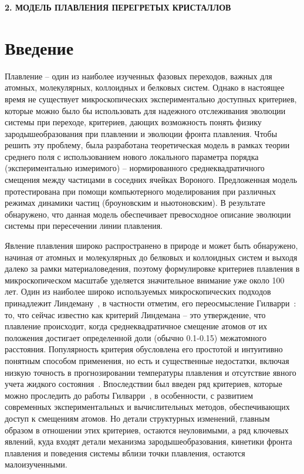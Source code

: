
\begin{center}
\textbf{\large 2. МОДЕЛЬ ПЛАВЛЕНИЯ ПЕРЕГРЕТЫХ КРИСТАЛЛОВ}
\end{center}


\section{Введение}

Плавление -- один из наиболее изученных фазовых переходов, важных для атомных, молекулярных, коллоидных и белковых систем.
Однако в настоящее время не существует микроскопических экспериментально доступных критериев, которые можно было бы использовать для надежного отслеживания эволюции системы при переходе, критериев, дающих возможность понять физику зародышеобразования при плавлении и эволюции фронта плавления.
Чтобы решить эту проблему, была разработана теоретическая модель в рамках теории среднего поля с использованием нового локального параметра порядка (экспериментально измеримого) -- нормированного среднеквадратичного смещения между частицами в соседних ячейках Вороного.
Предложенная модель протестирована при помощи компьютерного моделирования при различных режимах динамики частиц (броуновским и ньютоновским).
В результате обнаружено, что данная модель обеспечивает превосходное описание эволюции системы при пересечении линии плавления.

Явление плавления широко распространено в природе и может быть обнаружено, начиная от атомных и молекулярных до белковых и коллоидных систем и выходя далеко за рамки материаловедения, поэтому формулировке критериев плавления в микроскопическом масштабе уделяется значительное внимание уже около 100 лет.
Один из наиболее широко используемых микроскопических подходов принадлежит Линдеману~\cite{lindemann1910}, в частности отметим, его переосмысление Гилварри~\cite{10.1103/physrev.102.308}: то, что сейчас известно как критерий Линдемана -- это утверждение, что плавление происходит, когда среднеквадратичное смещение атомов от их положения достигает определенной доли (обычно 0.1-0.15) межатомного расстояния.
Популярность критерия обусловлена его простотой и интуитивно понятным способом применения, но есть и существенные недостатки, включая низкую точность в прогнозировании температуры плавления и отсутствие явного учета жидкого состояния~\cite{10.1098/rspa.1991.0068}.
Впоследствии был введен ряд критериев, которые можно проследить до работы Гилварри~\cite{10.1063/1.1426419}, в особенности, с развитием современных экспериментальных и вычислительных методов, обеспечивающих доступ к смещениям атомов.
Но детали структурных изменений, главным образом в отношении этих критериев, остаются неуловимыми, а ряд ключевых явлений, куда входят детали механизма зародышеобразования, кинетики фронта плавления и поведения системы вблизи точки плавления, остаются малоизученными.


